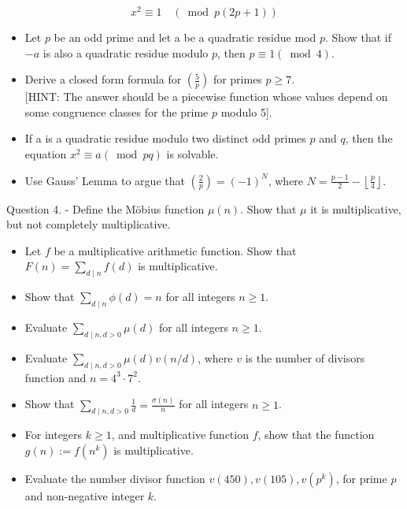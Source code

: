 \documentclass[10pt]{article}
\begin{document}
$$
x^{2} \equiv 1 \quad(\bmod p(2 p+1))
$$

\begin{itemize}
  \item Let $p$ be an odd prime and let a be a quadratic residue mod $p$. Show that if $-a$ is also a quadratic residue modulo $p$, then $p \equiv 1(\bmod 4)$.
  \item Derive a closed form formula for $\left(\frac{5}{p}\right)$ for primes $p \geq 7$.\\[0pt]
[HINT: The answer should be a piecewise function whose values depend on some congruence classes for the prime $p$ modulo 5].
  \item If a is a quadratic residue modulo two distinct odd primes $p$ and $q$, then the equation $x^{2} \equiv a(\bmod p q)$ is solvable.
  \item Use Gauss' Lemma to argue that $\left(\frac{2}{p}\right)=(-1)^{N}$, where $N=\frac{p-1}{2}-\left\lfloor\frac{p}{4}\right\rfloor$.
\end{itemize}

Question 4. - Define the Möbius function $\mu(n)$. Show that $\mu$ it is multiplicative, but not completely multiplicative.

\begin{itemize}
  \item Let $f$ be a multiplicative arithmetic function. Show that $F(n)=\sum_{d \mid n} f(d)$ is multiplicative.
  \item Show that $\sum_{d \mid n} \phi(d)=n$ for all integers $n \geq 1$.
  \item Evaluate $\sum_{d \mid n, d>0} \mu(d)$ for all integers $n \geq 1$.
  \item Evaluate $\sum_{d \mid n, d>0} \mu(d) v(n / d)$, where $v$ is the number of divisors function and $n=4^{3} \cdot 7^{2}$.
  \item Show that $\sum_{d \mid n, d>0} \frac{1}{d}=\frac{\sigma(n)}{n}$ for all integers $n \geq 1$.
  \item For integers $k \geq 1$, and multiplicative function $f$, show that the function $g(n):=f\left(n^{k}\right)$ is multiplicative.
  \item Evaluate the number divisor function $v(450), v(105), v\left(p^{k}\right)$, for prime $p$ and non-negative integer $k$.
\end{itemize}
\end{document}
